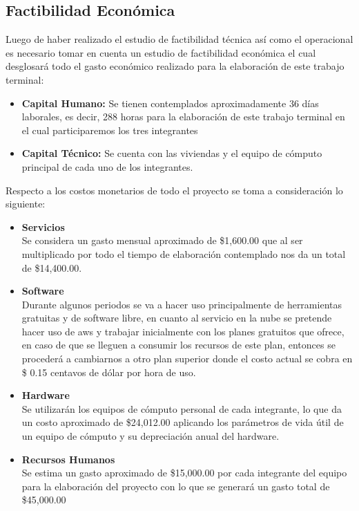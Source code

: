 \documentclass[12pt, a4paper, titlepage]{report}
\begin{document}
    	\subsection{Factibilidad Económica}
    	Luego de haber realizado el estudio de factibilidad técnica así como el operacional es necesario tomar en cuenta un estudio de factibilidad económica el cual desglosará todo el gasto económico realizado para la elaboración de este trabajo terminal:
    	\begin{itemize}
    		\item \textbf{Capital Humano:} Se tienen contemplados aproximadamente 36 días laborales, es decir, 288 horas para la elaboración de este trabajo terminal en el cual participaremos los tres integrantes
    		\item \textbf{Capital Técnico:} Se cuenta con las viviendas y el equipo de cómputo principal de cada uno de los integrantes.
    	\end{itemize}
    	Respecto a los costos monetarios de todo el proyecto se toma a consideración lo siguiente:
    	\begin{itemize}
    		\item \textbf{Servicios}\\
    		Se considera un gasto mensual aproximado de \$1,600.00 que al ser multiplicado por todo el tiempo de elaboración contemplado nos da un total de \$14,400.00.
    		\item \textbf{Software} \\
    		Durante algunos periodos se va a hacer uso principalmente de herramientas gratuitas y de software libre, en cuanto al servicio en la nube se pretende hacer uso de \acrshort{aws} y trabajar inicialmente con los planes gratuitos que ofrece, en caso de que se lleguen a consumir los recursos de este plan, entonces se procederá a cambiarnos a otro plan superior donde el costo actual se cobra en \$ 0.15 centavos de dólar por hora de uso.
    		\item \textbf{Hardware}\\
    		Se utilizarán los equipos de cómputo personal de cada integrante, lo que da un costo aproximado de \$24,012.00 aplicando los parámetros de vida útil de un equipo de cómputo y su depreciación anual del hardware. 
    		\item \textbf{Recursos Humanos}\\
    		Se estima un gasto aproximado de \$15,000.00 por cada integrante del equipo para la elaboración del proyecto con lo que se generará un gasto total de \$45,000.00
    	\end{itemize}
\end{document}
